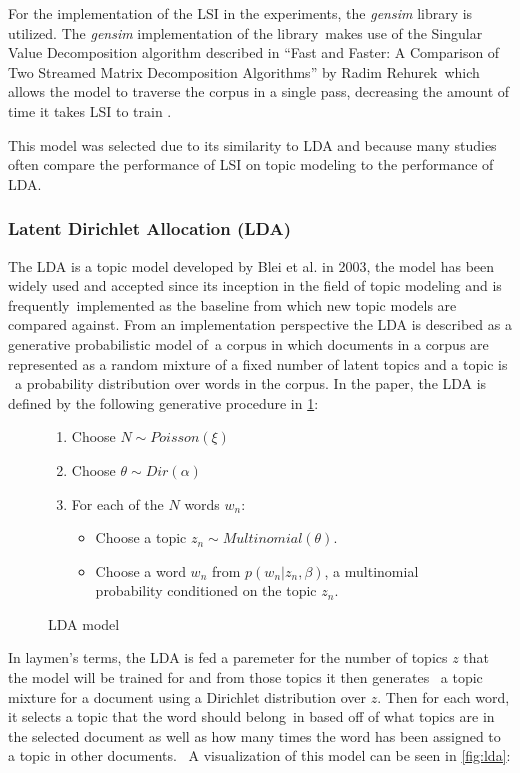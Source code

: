 \documentclass[letterpaper,12pt]{article}
\begin{document}
For the implementation of the LSI in the experiments, the \emph{gensim} \cite{gensim} library is utilized. The \emph{gensim} implementation of the library\
makes use of the Singular Value Decomposition algorithm described in ``Fast and Faster: A Comparison of Two Streamed Matrix Decomposition Algorithms'' by Radim Rehurek\
which allows the model to traverse the corpus in a single pass, decreasing the amount of time it takes LSI to train \cite{rehurek2011}.

This model was selected due to its similarity to LDA and because many studies often compare the performance of LSI on topic modeling to the performance of LDA.

\subsubsection{Latent Dirichlet Allocation (LDA)}
The LDA is a topic model developed by Blei et al. in 2003, the model has been widely used and accepted since its inception in the field of topic modeling and is frequently\
implemented as the baseline from which new topic models are compared against. From an implementation perspective the LDA is described as a generative probabilistic model of\
a corpus in which documents in a corpus are represented as a random mixture of a fixed number of latent topics and a topic is \
a probability distribution over words in the corpus. In the paper, the LDA is defined by the following generative procedure in \ref{eqn:lda}:

\begin{figure}
	\begin{enumerate}
		\item Choose $N \sim Poisson(\xi)$
		\item Choose $\theta \sim Dir(\alpha)$
		\item For each of the $N$ words $w_n$:
		\begin{itemize}
			\item Choose a topic $z_n \sim Multinomial(\theta)$.
			\item Choose a word $w_n$ from $p(w_n|z_n,\beta)$, a multinomial probability conditioned on the topic $z_n$.
		\end{itemize}
	\end{enumerate}
	\caption{LDA model \cite{blei2003latent}}
	\label{eqn:lda}
\end{figure}

In laymen's terms, the LDA is fed a paremeter for the number of topics $z$ that the model will be trained for and from those topics it then generates \
a topic mixture for a document using a Dirichlet distribution over $z$. Then for each word, it selects a topic that the word should belong\
in based off of what topics are in the selected document as well as how many times the word has been assigned to a topic in other documents. \
A visualization of this model can be seen in \ref{fig:lda}: 
\end{document}
